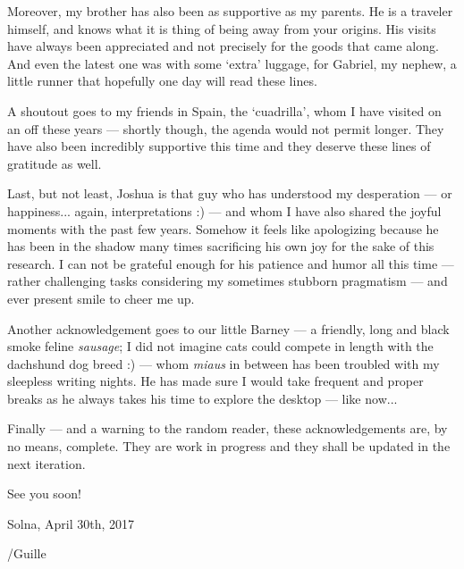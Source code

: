 Moreover, my brother has also been as supportive as my parents. He is a traveler 
himself, and knows what it is thing of being away from your origins. His visits 
have always been appreciated and not precisely for the goods that came along. And 
even the latest one was with some `extra' luggage, for Gabriel, my nephew, a little 
runner that hopefully one day will read these lines.

A shoutout goes to my friends in Spain, the `cuadrilla', whom I have visited on 
an off these years --- shortly though, the agenda would not permit longer. They 
have also been incredibly supportive this time and they deserve these lines of gratitude 
as well.

Last, but not least, Joshua is that guy who has understood my desperation --- or happiness... 
again, interpretations :) --- and whom I have also shared the joyful moments with 
the past few years. Somehow it feels like apologizing because he has been in the 
shadow many times sacrificing his own joy for the sake of this research. I can not 
be grateful enough for his patience and humor all this time --- rather challenging 
tasks considering my sometimes stubborn pragmatism --- and ever present smile to 
cheer me up.

Another acknowledgement goes to our little Barney --- a friendly, long and black 
smoke feline \emph{sausage}; I did not imagine cats could compete in length with 
the dachshund dog breed :) --- whom \emph{miaus} in between has been troubled with 
my sleepless writing nights. He has made sure I would take frequent and proper breaks 
as he always takes his time to explore the desktop --- like now...

Finally --- and a warning to the random reader, these acknowledgements are, by no 
means, complete. They are work in progress and they shall be updated in the next 
iteration.

See you soon!

\vspace{1.5em}

\hfill\begin{minipage}[t]{0.33\textwidth}
        \begin{center}
            Solna, April 30th, 2017
            
            \vspace{0.75em}
            
            /Guille
        \end{center}
\end{minipage}

